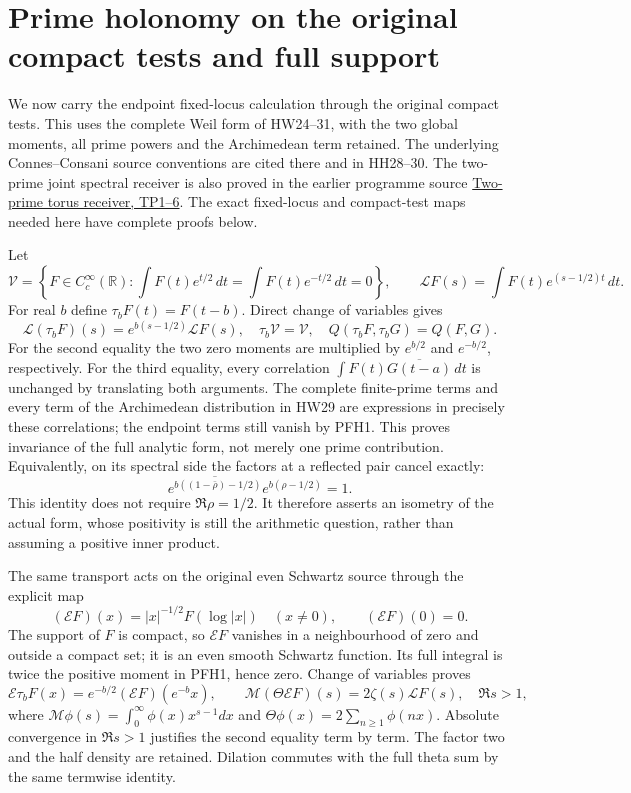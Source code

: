 \section{Prime holonomy on the original compact tests and full support}
\label{sec:pfh}

We now carry the endpoint fixed-locus calculation through the original
compact tests. This uses the complete Weil form of HW24--31, with
the two global moments, all prime powers and the Archimedean term
retained. The underlying Connes--Consani source conventions are cited
there and in HH28--30. The two-prime joint spectral receiver is also
proved in the earlier programme source
\href{https://github.com/KokunoYumeto/zeta-function-research-reader/blob/5a89872598df0902b7c1393cf8e4692ca3010a95/workbenches/splitzero-tandem/continuations/20260923-cohomology-heat-residue/graph-pulse/FULL_RECONSTRUCTION.tex}{Two-prime torus receiver, TP1--6}.
The exact fixed-locus and compact-test maps needed here have complete
proofs below.

Let
\[
 \mathcal V=\left\{F\in C_c^\infty(\mathbb R):
    \int F(t)e^{t/2}\,dt=\int F(t)e^{-t/2}\,dt=0\right\},
 \qquad \mathcal L F(s)=\int F(t)e^{(s-1/2)t}\,dt.
 \tag{PFH1}
\]
For real $b$ define $\tau_bF(t)=F(t-b)$. Direct change of variables
gives
\[
 \mathcal L(\tau_bF)(s)=e^{b(s-1/2)}\mathcal LF(s),\quad
 \tau_b\mathcal V=\mathcal V,\quad
 Q(\tau_bF,\tau_bG)=Q(F,G).
 \tag{PFH2}
\]
For the second equality the two zero moments are multiplied by
$e^{b/2}$ and $e^{-b/2}$, respectively. For the third equality,
every correlation
$\int F(t)\overline{G(t-a)}\,dt$ is unchanged by translating
both arguments. The complete finite-prime terms and every term of
the Archimedean distribution in HW29 are expressions in precisely
these correlations; the endpoint terms still vanish by PFH1.
This proves invariance of the full analytic form, not merely one
prime contribution. Equivalently, on its spectral side the factors
at a reflected pair cancel exactly:
\[
 \overline{e^{b((1-\bar\rho)-1/2)}}
                    e^{b(\rho-1/2)}=1.
\]
This identity does not require $\Re\rho=1/2$. It therefore
asserts an isometry of the actual form, whose positivity is still
the arithmetic question, rather than assuming a positive inner product.

The same transport acts on the original even Schwartz source through
the explicit map
\[
 (\mathcal EF)(x)=|x|^{-1/2}F(\log|x|)\quad(x\ne0),
       \qquad(\mathcal EF)(0)=0.
 \tag{PFH3}
\]
The support of $F$ is compact, so $\mathcal EF$ vanishes in a
neighbourhood of zero and outside a compact set; it is an even
smooth Schwartz function. Its full integral is twice the positive
moment in PFH1, hence zero. Change of variables proves
\[
 \mathcal E\tau_bF(x)=e^{-b/2}(\mathcal EF)(e^{-b}x),\qquad
 \mathcal M(\Theta\mathcal EF)(s)=2\zeta(s)\mathcal LF(s),
       \quad\Re s>1,
 \tag{PFH4}
\]
where $\mathcal M\phi(s)=\int_0^\infty\phi(x)x^{s-1}dx$ and
$\Theta\phi(x)=2\sum_{n\ge1}\phi(nx)$. Absolute convergence in
$\Re s>1$ justifies the second equality term by term. The factor
two and the half density are retained. Dilation commutes with the
full theta sum by the same termwise identity.

